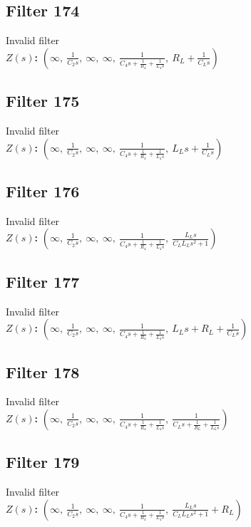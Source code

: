 \documentclass{article}
\begin{document}
\subsection*{Filter 174}
Invalid filter \\ 
\textbf{$Z(s)$:} $\left( \infty, \  \frac{1}{C_{2} s}, \  \infty, \  \infty, \  \frac{1}{C_{4} s + \frac{1}{R_{4}} + \frac{1}{L_{4} s}}, \  R_{L} + \frac{1}{C_{L} s}\right)$ \\ 
\subsection*{Filter 175}
Invalid filter \\ 
\textbf{$Z(s)$:} $\left( \infty, \  \frac{1}{C_{2} s}, \  \infty, \  \infty, \  \frac{1}{C_{4} s + \frac{1}{R_{4}} + \frac{1}{L_{4} s}}, \  L_{L} s + \frac{1}{C_{L} s}\right)$ \\ 
\subsection*{Filter 176}
Invalid filter \\ 
\textbf{$Z(s)$:} $\left( \infty, \  \frac{1}{C_{2} s}, \  \infty, \  \infty, \  \frac{1}{C_{4} s + \frac{1}{R_{4}} + \frac{1}{L_{4} s}}, \  \frac{L_{L} s}{C_{L} L_{L} s^{2} + 1}\right)$ \\ 
\subsection*{Filter 177}
Invalid filter \\ 
\textbf{$Z(s)$:} $\left( \infty, \  \frac{1}{C_{2} s}, \  \infty, \  \infty, \  \frac{1}{C_{4} s + \frac{1}{R_{4}} + \frac{1}{L_{4} s}}, \  L_{L} s + R_{L} + \frac{1}{C_{L} s}\right)$ \\ 
\subsection*{Filter 178}
Invalid filter \\ 
\textbf{$Z(s)$:} $\left( \infty, \  \frac{1}{C_{2} s}, \  \infty, \  \infty, \  \frac{1}{C_{4} s + \frac{1}{R_{4}} + \frac{1}{L_{4} s}}, \  \frac{1}{C_{L} s + \frac{1}{R_{L}} + \frac{1}{L_{L} s}}\right)$ \\ 
\subsection*{Filter 179}
Invalid filter \\ 
\textbf{$Z(s)$:} $\left( \infty, \  \frac{1}{C_{2} s}, \  \infty, \  \infty, \  \frac{1}{C_{4} s + \frac{1}{R_{4}} + \frac{1}{L_{4} s}}, \  \frac{L_{L} s}{C_{L} L_{L} s^{2} + 1} + R_{L}\right)$ \\ 
\end{document}
